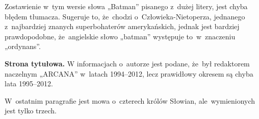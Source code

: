 \documentclass[a4paper,11pt]{article}
\begin{document}
\start {} Zostawienie w~tym wersie słowa „Batman”
pisanego z~dużej litery, jest chyba błędem tłumacza. Sugeruje to,
że~chodzi o~Człowieka-Nietoperza, jednanego z~najbardziej
znanych superbohaterów amerykańskich, jednak jest bardziej
prawdopodobne, że~angielskie słowo „batman” występuje to~w~znaczeniu
„ordynans”.











\vspace{\spaceTwo}














\start \textbf{Strona tytułowa.} W informacjach o~autorze jest podane,
że~był redaktorem naczelnym „ARCANA” w~latach 1994--2012, lecz
prawidłowy okresem są chyba lata 1995--2012.

\vspace{\spaceFour}



\start {} W~ostatnim paragrafie jest mowa o~czterech królów
Słowian, ale~wymienionych jest tylko trzech.
\end{document}
